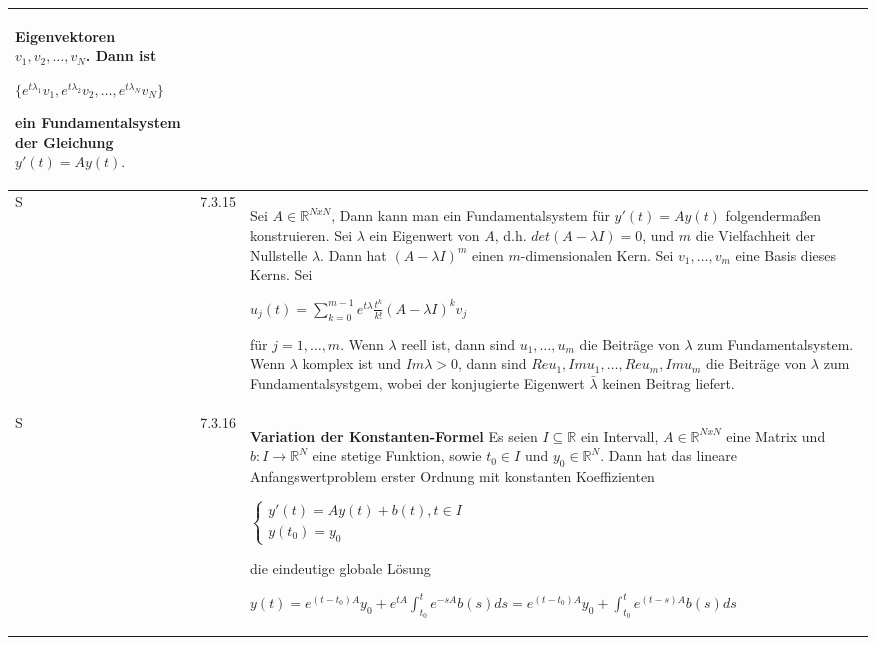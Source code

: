 \begin{longtable}{p{0.75cm} p{1cm} p{16cm}}
                        Eigenvektoren $v_1, v_2, \dots, v_N$. Dann ist \hfill \break
                        \centerline{$ \{e^{t \lambda_1}v_1, e^{t \lambda_2}v_2, \dots, e^{t\lambda_N}v_N\} $}
                        ein Fundamentalsystem der Gleichung $y'(t) = Ay(t).$ \\
        \midrule
        S   & 7.3.15&   Sei $A \in \mathbb{R}^{NxN}$, Dann kann man ein Fundamentalsystem für $y'(t) = Ay(t)$ folgendermaßen konstruieren. Sei 
                        $\lambda$ ein Eigenwert von $A$, d.h. $det(A-\lambda I) = 0$, und $m$ die Vielfachheit der Nullstelle $\lambda$. Dann hat
                        $(A- \lambda I)^m$ einen $m$-dimensionalen Kern. Sei $v_1,\dots, v_m$ eine Basis dieses Kerns. Sei \hfill \break
                        \centerline{$ u_j(t) = \sum_{k=0}^{m-1} e^{t\lambda}  \frac{t^k}{k!} (A- \lambda I)^k v_j$}
                        für $j = 1, \dots, m$. \hfill \break
                        Wenn $\lambda$ reell ist, dann sind $u_1, \dots, u_m$ die Beiträge von $\lambda$ zum Fundamentalsystem. \hfill \break
                        Wenn $\lambda$ komplex ist und $Im\lambda > 0$, dann sind $Reu_1, Imu_1,\dots,Reu_m, Imu_m$ die Beiträge von $\lambda$ zum
                        Fundamentalsystgem, wobei der konjugierte Eigenwert $\bar{\lambda}$ keinen Beitrag liefert.\\
        \midrule
        S   & 7.3.16&   \textbf{Variation der Konstanten-Formel} \hfill \break
                        Es seien $I \subseteq \mathbb{R}$ ein Intervall, $A \in \mathbb{R}^{NxN}$ eine Matrix und $b: I \rightarrow \mathbb{R}^N$ eine 
                        stetige Funktion, sowie $t_0 \in I$ und $y_0 \in \mathbb{R}^N$. Dann hat das lineare Anfangswertproblem erster Ordnung mit
                        konstanten Koeffizienten \hfill \break
                        \centerline{$   \begin{cases}
                                        y'(t) = Ay(t) +b(t), t \in I \\
                                        y(t_0) = y_0
                                        \end{cases} $}
                        die eindeutige globale Lösung \hfill \break
                        \centerline{$ y(t) = e^{(t-t_0)A}y_0 + e^{tA} \int^t_{t_0} e^{-sA}b(s) ds = e^{(t-t_0)A}y_0 + \int^t_{t_0} e^{(t-s)A}b(s) ds $}\\
        \bottomrule

    \end{longtable}

